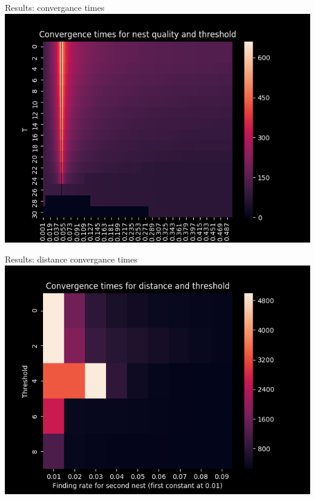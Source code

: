 \documentclass{beamer}
\begin{document}
\begin{frame}{Results: convergance times}
    \includegraphics[scale=0.6]{convergance_times}
\end{frame}

\begin{frame}{Results: distance convergance times}
    \includegraphics[scale=0.7]{distance_convergance_times_low_T}
\end{frame}
\end{document}
